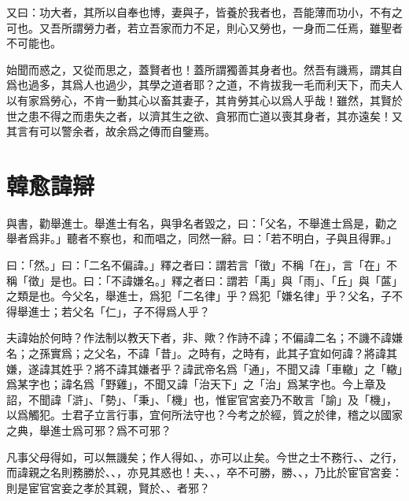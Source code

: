 又曰：功大者，其所以自奉也博，妻與子，皆養於我者也，吾能薄而功小，不有之可也。又吾所謂勞力者，若立吾家而力不足，則心又勞也，一身而二任焉，雖聖者不可{能}也。

始聞而惑之，又從而思之，蓋賢者也！蓋所謂獨善其身者也。然吾有譏焉，謂其自爲也過多，其爲人也過少，其學之道者耶？之道，不肯拔我一毛而利天下，而夫人以有家爲勞心，不肯一動其心以畜其妻子，其肯勞其心以爲人乎哉！雖然，其賢於世之患不得之而患失之者，以濟其生之欲、貪邪而亡道以喪其身者，其亦遠矣！又其言有可以警余者，故余爲之傳而自鑒焉。

\theendnotes

\section[諱辯\quad{\small 韓愈}]{{\normalsize 韓愈}\quad 諱辯}
與書，勸舉進士。舉進士有名，與爭名者毀之，曰：「父名，不舉進士爲是，勸之舉者爲非。」聽者不察也，和而唱之，同然一辭。曰：「若不明白，子與且得罪。」

曰：「然。」曰：「二名不偏諱。」釋之者曰：謂若言「徵」不稱「在」，言「在」不稱「徵」是也。曰：「不諱嫌名。」釋之者曰：謂若「禹」與「雨」、「丘」與「蓲」之類是也。今父名，舉進士，爲犯「二名律」乎？爲犯「嫌名律」乎？父名，子不得舉進士；若父名「仁」，子不得爲人乎？

夫諱始於何時？作法制以教天下者，非、歟？作詩不諱；不偏諱二名；不譏不諱嫌名；之孫實爲；之父名，不諱「昔」。之時有，之時有，此其子宜如何諱？將諱其嫌，遂諱其姓乎？將不諱其嫌者乎？諱武帝名爲「通」，不聞又諱「車轍」之「轍」爲某字也；諱名爲「野雞」，不聞又諱「治天下」之「治」爲某字也。今上章及詔，不聞諱「滸」、「勢」、「秉」、「機」也，惟宦官宮妾乃不敢言「諭」及「機」，以爲觸犯。士君子立言行事，宜何所法守也？今考之於經，質之於律，稽之以國家之典，舉進士爲可邪？爲不可邪？

凡事父母得如，可以無譏矣；作人得如、，亦可以止矣。今世之士不務行、、之行，而諱親之名則務勝於、、，亦見其惑也！夫、、，卒不可勝，勝、、，乃比於宦官宮妾：則是宦官宮妾之孝於其親，賢於、、者邪？

